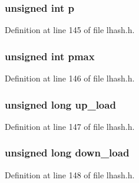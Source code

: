 \subsubsection[{\texorpdfstring{p}{p}}]{\setlength{\rightskip}{0pt plus 5cm}unsigned int p}\hypertarget{structlhash__st_a792fef4919ad545581902926c8d43b60}{}\label{structlhash__st_a792fef4919ad545581902926c8d43b60}


Definition at line 145 of file lhash.\+h.

\subsubsection[{\texorpdfstring{pmax}{pmax}}]{\setlength{\rightskip}{0pt plus 5cm}unsigned int pmax}\hypertarget{structlhash__st_aed5536597c4b46cd24788dffbb241be4}{}\label{structlhash__st_aed5536597c4b46cd24788dffbb241be4}


Definition at line 146 of file lhash.\+h.

\subsubsection[{\texorpdfstring{up\+\_\+load}{up_load}}]{\setlength{\rightskip}{0pt plus 5cm}unsigned long up\+\_\+load}\hypertarget{structlhash__st_ab4cc33b9893cacee3efa0d1866355fcc}{}\label{structlhash__st_ab4cc33b9893cacee3efa0d1866355fcc}


Definition at line 147 of file lhash.\+h.

\subsubsection[{\texorpdfstring{down\+\_\+load}{down_load}}]{\setlength{\rightskip}{0pt plus 5cm}unsigned long down\+\_\+load}\hypertarget{structlhash__st_af342bea2eab7af190f152dcfcd412e73}{}\label{structlhash__st_af342bea2eab7af190f152dcfcd412e73}


Definition at line 148 of file lhash.\+h.

